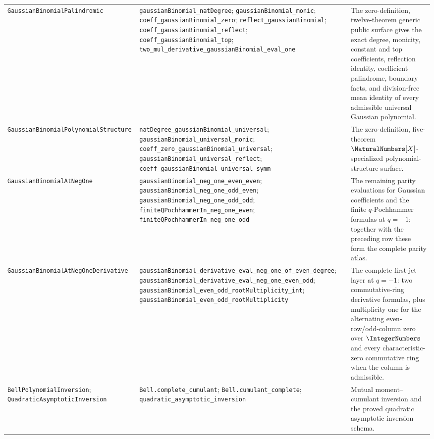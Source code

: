 \begin{longtable}{@{}>{\raggedright\arraybackslash}p{}>{\raggedright\arraybackslash}p{}>{\raggedright\arraybackslash}p{}@{}}
\nolinkurl{GaussianBinomialPalindromic}
&
\nolinkurl{gaussianBinomial_natDegree};
\nolinkurl{gaussianBinomial_monic};
\nolinkurl{coeff_gaussianBinomial_zero};
\nolinkurl{reflect_gaussianBinomial};
\nolinkurl{coeff_gaussianBinomial_reflect};
\nolinkurl{coeff_gaussianBinomial_top};
\nolinkurl{two_mul_derivative_gaussianBinomial_eval_one}
&
The zero-definition, twelve-theorem generic public surface gives the exact
degree, monicity, constant and top coefficients, reflection identity,
coefficient palindrome, boundary facts, and division-free mean identity of
every admissible universal Gaussian polynomial.
\\

\nolinkurl{GaussianBinomialPolynomialStructure}
&
\nolinkurl{natDegree_gaussianBinomial_universal};
\nolinkurl{gaussianBinomial_universal_monic};
\nolinkurl{coeff_zero_gaussianBinomial_universal};
\nolinkurl{gaussianBinomial_universal_reflect};
\nolinkurl{coeff_gaussianBinomial_universal_symm}
&
The zero-definition, five-theorem \(\NaturalNumbers[X]\)-specialized
polynomial-structure surface.
\\

\nolinkurl{GaussianBinomialAtNegOne}
&
\nolinkurl{gaussianBinomial_neg_one_even_even};
\nolinkurl{gaussianBinomial_neg_one_odd_even};
\nolinkurl{gaussianBinomial_neg_one_odd_odd};
\nolinkurl{finiteQPochhammerIn_neg_one_even};
\nolinkurl{finiteQPochhammerIn_neg_one_odd}
&
The remaining parity evaluations for Gaussian coefficients and the finite
\(q\)-Pochhammer formulas at \(q=-1\); together with the preceding row these
form the complete parity atlas. \\

\nolinkurl{GaussianBinomialAtNegOneDerivative}
&
\nolinkurl{gaussianBinomial_derivative_eval_neg_one_of_even_degree};
\nolinkurl{gaussianBinomial_derivative_eval_neg_one_even_odd};
\nolinkurl{gaussianBinomial_even_odd_rootMultiplicity_int};
\nolinkurl{gaussianBinomial_even_odd_rootMultiplicity}
&
The complete first-jet layer at \(q=-1\): two commutative-ring derivative
formulas, plus multiplicity one for the alternating even-row/odd-column zero
over \(\IntegerNumbers\) and every characteristic-zero commutative ring when
the column is admissible. \\

\nolinkurl{BellPolynomialInversion};
\nolinkurl{QuadraticAsymptoticInversion}
&
\nolinkurl{Bell.complete_cumulant};
\nolinkurl{Bell.cumulant_complete};
\nolinkurl{quadratic_asymptotic_inversion}
&
Mutual moment--cumulant inversion and the proved quadratic asymptotic
inversion schema. \\
\end{longtable}
\endgroup

